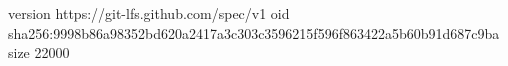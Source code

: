 version https://git-lfs.github.com/spec/v1
oid sha256:9998b86a98352bd620a2417a3c303c3596215f596f863422a5b60b91d687c9ba
size 22000
